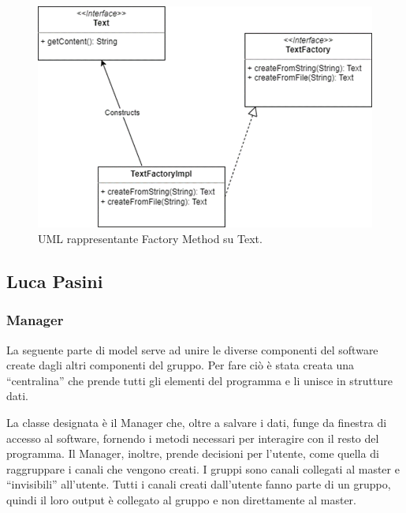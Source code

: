 \documentclass[a4paper,12pt]{report}
\begin{document}
\begin{figure}[H]
\centering{}
\includegraphics[scale=0.85]{img/text.png}
\caption{UML rappresentante Factory Method su Text.}
\end{figure}

\subsection{Luca Pasini}
\subsubsection{Manager}
La seguente parte di model serve ad unire le diverse componenti del software create dagli altri componenti del gruppo. Per fare ciò è stata creata una “centralina” che prende tutti gli elementi del programma e li unisce in strutture dati. 

La classe designata è il Manager che, oltre a salvare i dati, funge da finestra di accesso al software, fornendo i metodi necessari per interagire con il resto del programma. Il Manager, inoltre, prende decisioni per l’utente, come quella di raggruppare i canali che vengono creati. I gruppi sono canali collegati al master e “invisibili” all’utente. Tutti i canali creati dall’utente fanno parte di un gruppo, quindi il loro output è collegato al gruppo e non direttamente al master.
\end{document}
